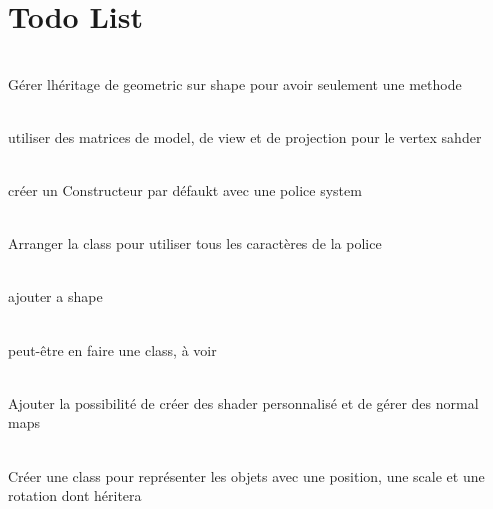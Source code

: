 \chapter{Todo List}
\hypertarget{todo}{}\label{todo}

\begin{DoxyRefList}
\item[Member \doxylink{classCamera_a043c162e8ee7db433202ceed6d12d25f}{Camera\+::is\+In\+Cam\+View} (\doxylink{classCollisionBox}{Collision\+Box} \&obj)]\hfill \\
\label{todo__todo000002}%
%
Gérer l\textquotesingle{}héritage de geometric sur shape pour avoir seulement une methode  
\item[Member \doxylink{shaders_8cpp_aa4e3821fb3d25cef0fcd8bd89a1666e8}{default\+Fragment} ]\hfill \\
\label{todo__todo000007}%
%
utiliser des matrices de model, de view et de projection pour le vertex sahder  
\item[Class \doxylink{classFont}{Font} ]\hfill \\
\label{todo__todo000003}%
%
créer un Constructeur par défaukt avec une police system  
\item[Member \doxylink{classFont_a41a7dca42ac0df85a27163dc9ace9de3}{Font\+::Font} (int glyph\+Size, const char \texorpdfstring{$\ast$}{*}ttf\+Path)]\hfill \\
\label{todo__todo000004}%
%
Arranger la class pour utiliser tous les caractères de la police  
\item[Class \doxylink{classGeometric}{Geometric} ]\hfill \\
\label{todo__todo000005}%
%
ajouter a shape  
\item[Struct \doxylink{structImage}{Image} ]\hfill \\
\label{todo__todo000009}%
%
peut-\/être en faire une class, à voir  
\item[Class \doxylink{classScene}{Scene} ]\hfill \\
\label{todo__todo000006}%
%
Ajouter la possibilité de créer des shader personnalisé et de gérer des normal maps  
\item[Class \doxylink{classShape}{Shape} ]\hfill \\
\label{todo__todo000008}%
%
Créer une class pour représenter les objets avec une position, une scale et une rotation dont  héritera 




\end{DoxyRefList}
